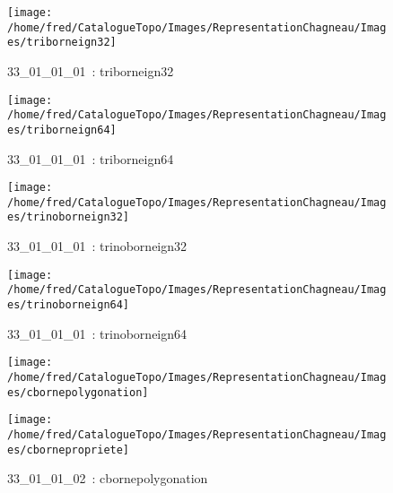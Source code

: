 \documentclass[12pt,titlepage]{book}
\begin{document}
\begin{figure}[h!]
\begin{minipage}[t]{3cm}
\begin{center}
      \texttt{[image: /home/fred/CatalogueTopo/Images/RepresentationChagneau/Images/triborneign32]}
      \caption[~33\_01\_01\_01]{\small{33\_01\_01\_01~:} \tiny{triborneign32}}\label{triborneign32}
    \end{center}
  \end{minipage}
  \begin{minipage}[t]{3cm}
    \begin{center}
      \texttt{[image: /home/fred/CatalogueTopo/Images/RepresentationChagneau/Images/triborneign64]}
      \caption[~33\_01\_01\_01]{\small{33\_01\_01\_01~:} \tiny{triborneign64}}\label{triborneign64}
    \end{center}
  \end{minipage}
  \begin{minipage}[t]{3cm}
    \begin{center}
      \texttt{[image: /home/fred/CatalogueTopo/Images/RepresentationChagneau/Images/trinoborneign32]}
      \caption[~33\_01\_01\_01]{\small{33\_01\_01\_01~:} \tiny{trinoborneign32}}\label{trinoborneign32}
    \end{center}
  \end{minipage}
  \begin{minipage}[t]{3cm}
    \begin{center}
      \texttt{[image: /home/fred/CatalogueTopo/Images/RepresentationChagneau/Images/trinoborneign64]}
      \caption[~33\_01\_01\_01]{\small{33\_01\_01\_01~:} \tiny{trinoborneign64}}\label{trinoborneign64}
    \end{center}
  \end{minipage}
  \begin{minipage}[t]{3cm}
    \begin{center}
      \texttt{[image: /home/fred/CatalogueTopo/Images/RepresentationChagneau/Images/cbornepolygonation]}
      \caption[~33\_01\_01\_02]{\small{33\_01\_01\_02~:} \tiny{cbornepolygonation}}\label{cbornepolygonation}
    \end{center}
  \end{minipage}
  \begin{minipage}[t]{3cm}
    \begin{center}
      \texttt{[image: /home/fred/CatalogueTopo/Images/RepresentationChagneau/Images/cbornepropriete]}

\end{center}
\end{minipage}
\end{figure}
\end{document}
